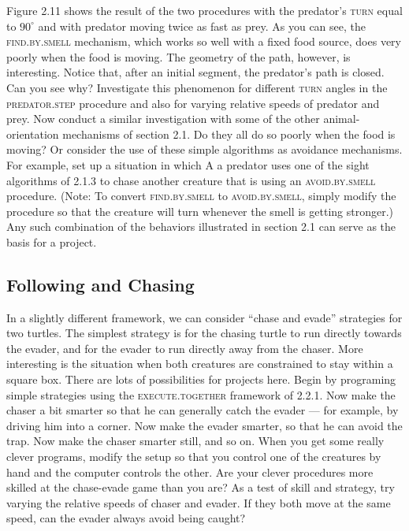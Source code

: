 \documentclass{book}
\begin{document}
Figure 2.11 shows the result of the two procedures with the predator's
\textsc{turn} equal to $90^{\circ}$ and with predator moving twice as fast as prey. As
you can see, the \textsc{find.by.smell} mechanism, which works so well with
a fixed food source, does very poorly when the food is moving. The
geometry of the path, however, is interesting. Notice that, after an initial
segment, the predator's path is closed. Can you see why? Investigate this
phenomenon for different \textsc{turn} angles in the \textsc{predator}\textsc{.step} procedure
and also for varying relative speeds of predator and prey.
Now conduct a similar investigation with some of the other animal-orientation mechanisms of section 2.1. Do they all do so poorly when
the food is moving? Or consider the use of these simple algorithms
as avoidance mechanisms. For example, set up a situation in which
A a predator uses one of the sight algorithms of 2.1.3 to chase another
creature that is using an \textsc{avoid}\textsc{.by}\textsc{.smell} procedure. (Note: To convert
\textsc{find}\textsc{.by}\textsc{.smell} to \textsc{avoid}\textsc{.by}\textsc{.smell}, simply modify the procedure so
that the creature will turn whenever the smell is getting stronger.) Any
such combination of the behaviors illustrated in section 2.1 can serve as
the basis for a project.

\subsection{Following and Chasing}

In a slightly different framework, we can consider ``chase and evade''
strategies for two turtles. The simplest strategy is for the chasing turtle
to run directly towards the evader, and for the evader to run directly
away from the chaser. More interesting is the situation when both
creatures are constrained to stay within a square box. There are lots
of possibilities for projects here. Begin by programing simple strategies
using the \textsc{execute}\textsc{.together} framework of 2.2.1. Now make the chaser
a bit smarter so that he can generally catch the evader --- for example, by
driving him into a corner. Now make the evader smarter, so that he can
avoid the trap. Now make the chaser smarter still, and so on. When you
get some really clever programs, modify the setup so that you control
one of the creatures by hand and the computer controls the other. Are
your clever procedures more skilled at the chase-evade game than you
are? As a test of skill and strategy, try varying the relative speeds of
chaser and evader. If they both move at the same speed, can the evader
always avoid being caught?
\end{document}
